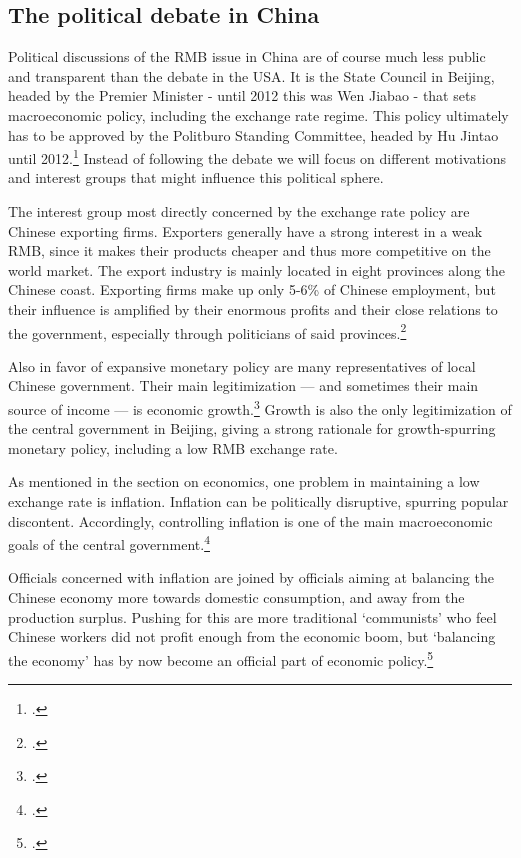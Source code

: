 \subsection{The political debate in China}

Political discussions of the RMB issue in China are of course much less 
public and transparent than the debate in the USA. It is the State 
Council in Beijing, headed by the Premier Minister - until 2012 this was 
Wen Jiabao - that sets macroeconomic policy, including the exchange rate 
regime.  This policy ultimately has to be approved by the Politburo 
Standing Committee, headed by Hu Jintao until 
2012.\footnote{\cite{naughton2008}.} Instead of following the debate we 
will focus on different motivations and interest groups that might 
influence this political sphere.

The interest group most directly concerned by the exchange rate policy 
are Chinese exporting firms. Exporters generally have a strong interest 
in a weak RMB, since it makes their products cheaper and thus more 
competitive on the world market. The export industry is mainly located 
in eight provinces along the Chinese coast. Exporting firms make up only 
5-6\% of Chinese employment, but their influence is amplified by their 
enormous profits and their close relations to the government, especially 
through politicians of said provinces.\footnote{\cite[p.  
202]{Breslin2010}.} 

Also in favor of expansive monetary policy are many representatives of 
local Chinese government. Their main legitimization --- and sometimes 
their main source of income --- is economic growth.\footnote{\cite[pp.  
19]{Levy2011}.} Growth is also the only legitimization of the central 
government in Beijing, giving a strong rationale for growth-spurring 
monetary policy, including a low RMB exchange rate.

As mentioned in the section on economics, one problem in maintaining a 
low exchange rate is inflation. Inflation can be politically disruptive, 
spurring popular discontent. Accordingly, controlling inflation is one 
of the main macroeconomic goals of the central 
government.\footnote{\cite{Naughton2011}.}

Officials concerned with inflation are joined by officials aiming at 
balancing the Chinese economy more towards domestic consumption, and 
away from the production surplus. Pushing for this are more traditional 
`communists' who feel Chinese workers did not profit enough from the 
economic boom, but `balancing the economy' has by now become an official 
part of economic policy.\footnote{\cite{Xinhua2011}.}

